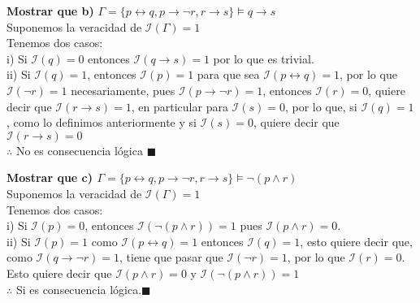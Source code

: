 \textbf{Mostrar que b)} $\Gamma = \{p\leftrightarrow q,p\rightarrow \neg r,r\rightarrow s\} \vDash q\rightarrow s$\\
Suponemos la veracidad de $\mathcal{I}(\Gamma)=1$\\
Tenemos dos casos:\\
 \indent i) Si $\mathcal{I}(q)=0$ entonces $\mathcal{I}(q\rightarrow s)=1$ por lo que es trivial.\\
\indent ii) Si $\mathcal{I}(q)=1$, entonces $\mathcal{I}(p)=1$ para que sea $\mathcal{I}(p\leftrightarrow q)=1$, por lo que $\mathcal{I}(\neg r)=1$ necesariamente, pues $\mathcal{I}(p\rightarrow \neg r)=1$, entonces $\mathcal{I}(r)=0$, quiere decir que $\mathcal{I}(r\rightarrow s)=1$, en particular para $\mathcal{I}(s)=0$, por lo que, si $\mathcal{I}(q)=1$, como lo definimos anteriormente y si $\mathcal{I}(s)=0$, quiere decir que $\mathcal{I}(r\rightarrow s)=0$\\
$\therefore$ No es consecuencia lógica $\blacksquare$
\vspace{5px}

\textbf{Mostrar que c) $\Gamma = \{p\leftrightarrow q,p\rightarrow \neg r,r\rightarrow s\} \vDash \neg (p\land r)$}\\
Suponemos la veracidad de $\mathcal{I}(\Gamma)=1$\\
Tenemos dos casos:\\
\indent i) Si $\mathcal{I}(p)=0$, entonces $\mathcal{I}(\neg(p\land r))=1$ pues $\mathcal{I}(p\land r)=0$.\\
\indent ii) Si $\mathcal{I}(p)=1$ como $\mathcal{I}(p \leftrightarrow q)=1$ entonces $\mathcal{I}(q)=1$, esto quiere decir que, como $\mathcal{I}(q\rightarrow \neg r)=1$, tiene que pasar que $\mathcal{I}(\neg r)=1$, por lo que $\mathcal{I}(r)=0$.\\
Esto quiere decir que $\mathcal{I}(p\land r)=0$ y $\mathcal{I}(\neg (p\land r))=1$\\
$\therefore$ Si es consecuencia lógica.$\blacksquare$
\vspace{5px}

